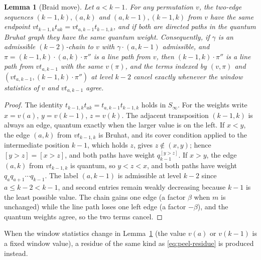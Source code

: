 \documentclass[11pt]{article}
\newtheorem{lemma}[proposition]{Lemma}
\begin{document}
\begin{lemma}[Braid move]\label{lem:braid}
Let $a<k-1$. For any permutation $v$, the two-edge sequences
$(k-1,k),(a,k)$ and $(a,k-1),(k-1,k)$ from $v$ have the same endpoint
$vt_{k-1,k}t_{ak}=vt_{a,k-1}t_{k-1,k}$, and if both are directed paths
in the quantum Bruhat graph they have the same quantum weight.
Consequently, if $\gamma$ is an admissible $(k-2)$-chain to $v$ with
$\gamma\cdot(a,k-1)$ admissible, and $\pi=(k-1,k)\cdot(a,k)\cdot\pi''$
is a line path from $v$, then $(k-1,k)\cdot\pi''$ is a line path from
$vt_{a,k-1}$ with the same $v(\pi)$, and the terms indexed by
$(v,\pi)$ and $(vt_{a,k-1},(k-1,k)\cdot\pi'')$ at level $k-2$ cancel
exactly whenever the window statistics of $v$ and $vt_{a,k-1}$
agree.
\end{lemma}

\begin{proof}
The identity $t_{k-1,k}t_{ak}=t_{a,k-1}t_{k-1,k}$ holds in $S_\infty$.
For the weights write $x=v(a)$, $y=v(k-1)$, $z=v(k)$. The adjacent
transposition $(k-1,k)$ is always an edge, quantum exactly when the
larger value is on the left. If $x<y$, the edge $(a,k)$ from
$vt_{k-1,k}$ is Bruhat, and its cover condition applied to the
intermediate position $k-1$, which holds $z$, gives $z\notin(x,y)$;
hence $[y>z]=[x>z]$, and both paths have weight $q_{k-1}^{[y>z]}$.
If $x>y$, the edge $(a,k)$ from $vt_{k-1,k}$ is quantum, so
$y<z<x$, and both paths have weight $q_aq_{a+1}\cdots q_{k-1}$.
The label $(a,k-1)$ is admissible at level $k-2$ since
$a\leq k-2<k-1$, and second entries remain weakly decreasing because
$k-1$ is the least possible value. The chain gains one edge
(a factor $\beta$ when $m$ is unchanged) while the line path loses
one left edge (a factor $-\beta$), and the quantum weights agree, so
the two terms cancel.
\end{proof}

When the window statistics change in Lemma~\ref{lem:braid} (the value
$v(a)$ or $v(k-1)$ is a fixed window value), a residue of the same
kind as \eqref{eq:peel-residue} is produced instead.
\end{document}
